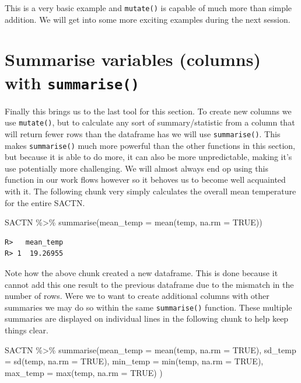 \documentclass[
]{book}
\newenvironment{Shaded}{\begin{snugshade}}{\end{snugshade}}
\newcommand{\AttributeTok}[1]{\textcolor[rgb]{0.77,0.63,0.00}{#1}}
\newcommand{\ConstantTok}[1]{\textcolor[rgb]{0.00,0.00,0.00}{#1}}
\newcommand{\FunctionTok}[1]{\textcolor[rgb]{0.00,0.00,0.00}{#1}}
\newcommand{\NormalTok}[1]{#1}
\newcommand{\SpecialCharTok}[1]{\textcolor[rgb]{0.00,0.00,0.00}{#1}}
\begin{document}
This is a very basic example and \texttt{mutate()} is capable of much more than simple addition. We will get into some more exciting examples during the next session.

\hypertarget{summarise-variables-columns-with-summarise}{%
\section{\texorpdfstring{Summarise variables (columns) with \texttt{summarise()}}{Summarise variables (columns) with summarise()}}\label{summarise-variables-columns-with-summarise}}

Finally this brings us to the last tool for this section. To create new columns we use \texttt{mutate()}, but to calculate any sort of summary/statistic from a column that will return fewer rows than the dataframe has we will use \texttt{summarise()}. This makes \texttt{summarise()} much more powerful than the other functions in this section, but because it is able to do more, it can also be more unpredictable, making it's use potentially more challenging. We will almost always end op using this function in our work flows however so it behoves us to become well acquainted with it. The following chunk very simply calculates the overall mean temperature for the entire SACTN.

\begin{Shaded}
\begin{Highlighting}[]
\NormalTok{SACTN }\SpecialCharTok{\%\textgreater{}\%} 
  \FunctionTok{summarise}\NormalTok{(}\AttributeTok{mean\_temp =} \FunctionTok{mean}\NormalTok{(temp, }\AttributeTok{na.rm =} \ConstantTok{TRUE}\NormalTok{))}
\end{Highlighting}
\end{Shaded}

\begin{verbatim}
R>   mean_temp
R> 1  19.26955
\end{verbatim}

Note how the above chunk created a new dataframe. This is done because it cannot add this one result to the previous dataframe due to the mismatch in the number of rows. Were we to want to create additional columns with other summaries we may do so within the same \texttt{summarise()} function. These multiple summaries are displayed on individual lines in the following chunk to help keep things clear.

\begin{Shaded}
\begin{Highlighting}[]
\NormalTok{SACTN }\SpecialCharTok{\%\textgreater{}\%} 
  \FunctionTok{summarise}\NormalTok{(}\AttributeTok{mean\_temp =} \FunctionTok{mean}\NormalTok{(temp, }\AttributeTok{na.rm =} \ConstantTok{TRUE}\NormalTok{),}
            \AttributeTok{sd\_temp =} \FunctionTok{sd}\NormalTok{(temp, }\AttributeTok{na.rm =} \ConstantTok{TRUE}\NormalTok{),}
            \AttributeTok{min\_temp =} \FunctionTok{min}\NormalTok{(temp, }\AttributeTok{na.rm =} \ConstantTok{TRUE}\NormalTok{),}
            \AttributeTok{max\_temp =} \FunctionTok{max}\NormalTok{(temp, }\AttributeTok{na.rm =} \ConstantTok{TRUE}\NormalTok{)}
\NormalTok{            )}
\end{Highlighting}
\end{Shaded}
\end{document}
